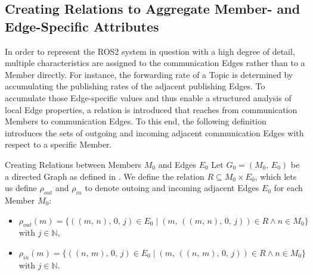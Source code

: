     \subsection{Creating Relations to Aggregate Member- and Edge-Specific Attributes} \label{subsec:mathModel:relation}
    In order to represent the ROS2 system in question with a high degree of detail, multiple characteristics are assigned to the communication Edges rather than to a Member directly. For instance, the forwarding rate of a Topic is determined by accumulating the publishing rates of the adjacent publishing Edges. To accumulate those Edge-specific values and thus enable a structured analysis of local Edge properties, a relation is introduced that reaches from communication Members to communication Edges. To this end, the following definition introduces the sets of outgoing and incoming adjacent communication Edges with respect to a specific Member.
\begin{samepage}
    \begin{definitionbox}[label=def:ros2extendedTree, list text={Creating Relations between communication Members and Edges}]{Creating Relations between Members $M_0$ and Edges $E_0$}{}
        Let $G_0 = (M_0,\,E_0)$ be a directed Graph as defined in . We define the relation $R \subseteq M_0 \times E_0$, which lets us define $\rho_{out}$ and $\rho_{in}$ to denote outoing and incoming adjacent Edges $E_0$ for each Member $M_0$:
        \begin{itemize}[label=$\circ$]
            \item $\rho_{out}(m) = \{((m,\,n),\,0,\,j) \in E_0 \mid (m,\,((m,\,n),\,0,\,j)) \in R \wedge n\in M_0\}$ with $j \in\mathbb{N}$,
            \item $\rho_{in}(m) = \{((n,\,m),\,0,\,j) \in E_0 \mid (m,\,((n,\,m),\,0,\,j)) \in R \wedge n\in M_0\}$ with $j \in\mathbb{N}$.
        \end{itemize}
    \end{definitionbox}
\end{samepage}

